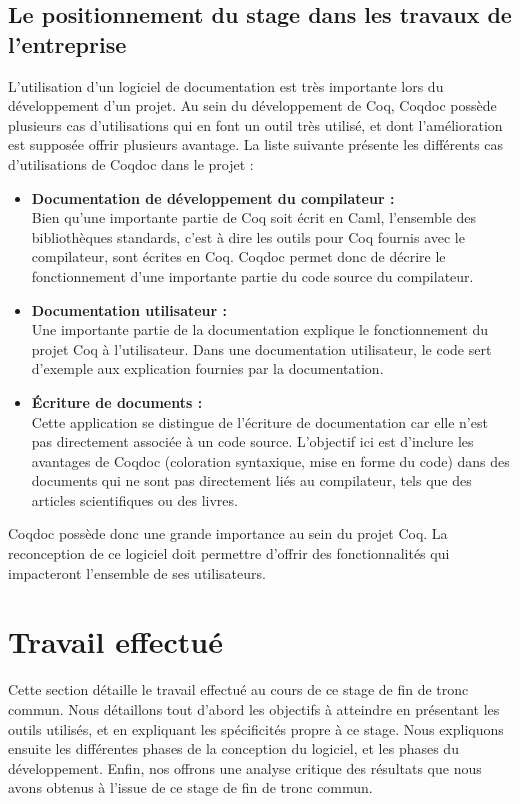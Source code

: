 \documentclass[a4paper, 11pt]{report}
\begin{document}
      \section{Le positionnement du stage dans les travaux de l'entreprise}
      L'utilisation d'un logiciel de documentation est très importante lors du
      développement d'un projet.
      Au sein du développement de Coq, Coqdoc possède plusieurs cas
      d'utilisations qui en font un outil très utilisé, et dont l'amélioration
      est supposée offrir plusieurs avantage. La liste suivante
      présente les différents cas d'utilisations de Coqdoc dans le projet :
      \begin{itemize}
        \item \textbf{Documentation de développement du compilateur :} \\
          Bien qu'une importante partie de Coq soit écrit en Caml, l'ensemble
          des bibliothèques standards, c'est à dire les outils pour Coq
          fournis avec le compilateur, sont écrites en Coq. Coqdoc permet donc
          de décrire le fonctionnement d'une importante partie du code source
          du compilateur.
        \item \textbf{Documentation utilisateur :} \\
          Une importante partie de la documentation explique le fonctionnement
          du projet Coq à l'utilisateur. Dans une documentation utilisateur,
          le code sert d'exemple aux explication fournies par la documentation.
        \item \textbf{Écriture de documents :} \\
          Cette application se distingue de l'écriture de documentation car
          elle n'est pas directement associée à un code source. L'objectif ici
          est d'inclure les avantages de Coqdoc (coloration syntaxique,
          mise en forme du code) dans des documents qui ne sont pas directement
          liés au compilateur, tels que des articles scientifiques ou des
          livres.
      \end{itemize}

      Coqdoc possède donc une grande importance au sein du projet Coq. La
      reconception de ce logiciel doit permettre d'offrir des fonctionnalités
      qui impacteront l'ensemble de ses utilisateurs.

\chapter{Travail effectué}
Cette section détaille le travail effectué au cours de ce stage de fin de tronc
commun. Nous détaillons tout d'abord les objectifs à atteindre en présentant
les outils utilisés, et en expliquant les spécificités propre à ce stage.
Nous expliquons ensuite les différentes phases de la conception du logiciel,
et les phases du développement. Enfin, nos offrons une analyse critique des
résultats que nous avons obtenus à l'issue de ce stage de fin de tronc commun.
\end{document}
